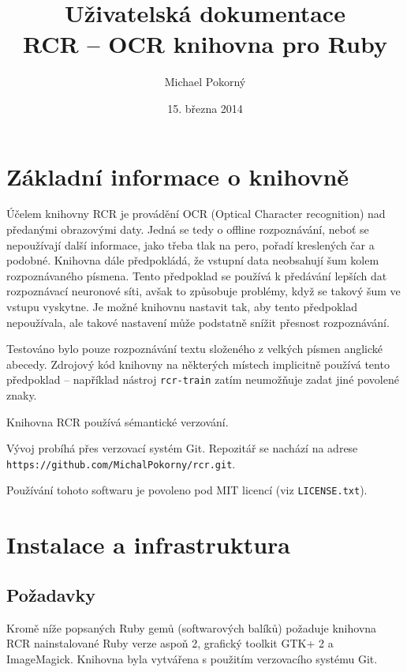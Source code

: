 \documentclass[a4paper]{article}
\def\datum{15. března 2014}
\def\githuburl{https://github.com/MichalPokorny/rcr.git}
\begin{document}
\title{Uživatelská dokumentace \\ RCR -- OCR knihovna pro Ruby}
\author{Michael Pokorný}
\date{\datum}

\maketitle

\tableofcontents

\section{Základní informace o knihovně}
Účelem knihovny RCR je provádění OCR (Optical Character recognition) nad
předanými obrazovými daty. Jedná se tedy o offline rozpoznávání, neboť
se nepoužívají další informace, jako třeba tlak na pero, pořadí kreslených
čar a podobné. Knihovna dále předpokládá, že vstupní data neobsahují
šum kolem rozpoznávaného písmena. Tento předpoklad se používá k předávání
lepších dat rozpoznávací neuronové síti, avšak to způsobuje problémy,
když se takový šum ve vstupu vyskytne. Je možné knihovnu nastavit tak, aby
tento předpoklad nepoužívala, ale takové nastavení může podstatně snížit
přesnost rozpoznávání.

Testováno bylo pouze rozpoznávání textu složeného z velkých písmen anglické
abecedy. Zdrojový kód knihovny na některých místech implicitně používá tento
předpoklad -- například nástroj \texttt{rcr-train} zatím neumožňuje zadat
jiné povolené znaky.

Knihovna RCR používá sémantické verzování.

Vývoj probíhá přes verzovací systém Git. Repozitář se nachází
na adrese \texttt{\githuburl}.

Používání tohoto softwaru je povoleno pod MIT licencí (viz \texttt{LICENSE.txt}).

\section{Instalace a infrastruktura}
\subsection{Požadavky}
Kromě níže popsaných Ruby gemů (softwarových balíků) požaduje knihovna RCR
nainstalované Ruby verze aspoň 2, grafický toolkit GTK+ 2 a ImageMagick.
Knihovna byla vytvářena s použitím verzovacího systému Git.
\end{document}
